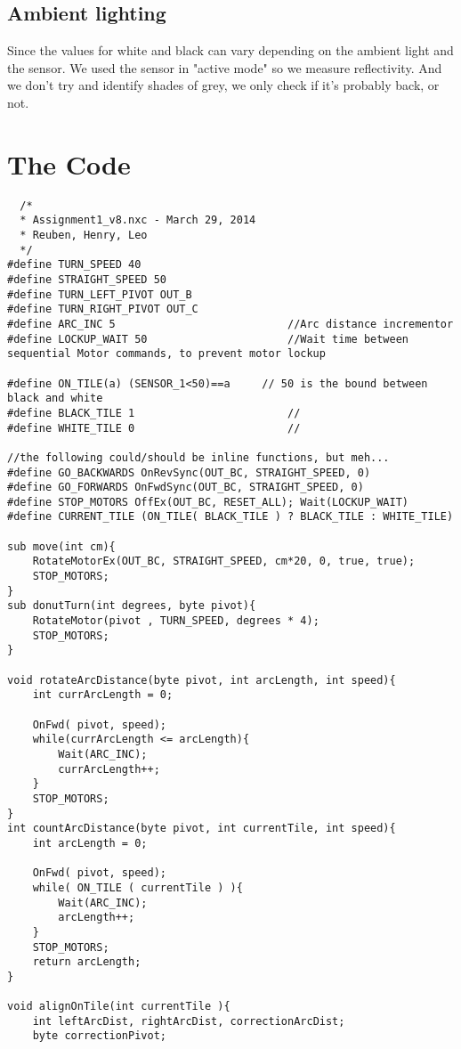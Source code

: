 \documentclass[a4paper,11pt]{article}
\begin{document}
\subsection{Ambient lighting}
Since the values for white and black can vary depending on the ambient light and the sensor.
We used the sensor in "active mode" so we measure reflectivity. And we don't try and identify shades of grey, we only check if it's probably back, or not.

\clearpage
\section {The Code}

\begin{lstlisting}
  /* 
  * Assignment1_v8.nxc - March 29, 2014
  * Reuben, Henry, Leo
  */
#define TURN_SPEED 40
#define STRAIGHT_SPEED 50
#define TURN_LEFT_PIVOT OUT_B
#define TURN_RIGHT_PIVOT OUT_C
#define ARC_INC 5                           //Arc distance incrementor
#define LOCKUP_WAIT 50                      //Wait time between sequential Motor commands, to prevent motor lockup

#define ON_TILE(a) (SENSOR_1<50)==a     // 50 is the bound between black and white
#define BLACK_TILE 1                        //
#define WHITE_TILE 0                        //

//the following could/should be inline functions, but meh...
#define GO_BACKWARDS OnRevSync(OUT_BC, STRAIGHT_SPEED, 0)
#define GO_FORWARDS OnFwdSync(OUT_BC, STRAIGHT_SPEED, 0)
#define STOP_MOTORS OffEx(OUT_BC, RESET_ALL); Wait(LOCKUP_WAIT)
#define CURRENT_TILE (ON_TILE( BLACK_TILE ) ? BLACK_TILE : WHITE_TILE)

sub move(int cm){
    RotateMotorEx(OUT_BC, STRAIGHT_SPEED, cm*20, 0, true, true);
    STOP_MOTORS;
}
sub donutTurn(int degrees, byte pivot){
    RotateMotor(pivot , TURN_SPEED, degrees * 4);
    STOP_MOTORS;
}

void rotateArcDistance(byte pivot, int arcLength, int speed){
    int currArcLength = 0;

    OnFwd( pivot, speed);
    while(currArcLength <= arcLength){
        Wait(ARC_INC);
        currArcLength++;
    }
    STOP_MOTORS;
}
int countArcDistance(byte pivot, int currentTile, int speed){
    int arcLength = 0;

    OnFwd( pivot, speed);
    while( ON_TILE ( currentTile ) ){
        Wait(ARC_INC);
        arcLength++;
    }
    STOP_MOTORS;
    return arcLength;
}

void alignOnTile(int currentTile ){
    int leftArcDist, rightArcDist, correctionArcDist;
    byte correctionPivot;


\end{lstlisting}
\end{document}
